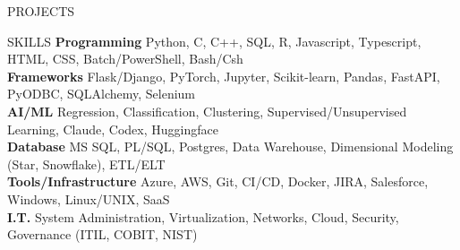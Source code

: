 \documentclass{resume} %
\begin{document}
\begin{rSection}{PROJECTS}
\begin{itemize}
\end{itemize}
\vspace{-6pt}

\end{rSection}

\begin{rSection}{SKILLS}
\vspace{-6pt}
\textbf{Programming} Python, C, C++, SQL, R, Javascript, Typescript, HTML, CSS, Batch/PowerShell, Bash/Csh \\
\textbf{Frameworks} Flask/Django, PyTorch, Jupyter, Scikit-learn, Pandas, FastAPI, PyODBC, SQLAlchemy, Selenium \\
\textbf{AI/ML} Regression, Classification, Clustering, Supervised/Unsupervised Learning, Claude, Codex, Huggingface \\
\textbf{Database} MS SQL, PL/SQL, Postgres, Data Warehouse, Dimensional Modeling (Star, Snowflake), ETL/ELT \\
\textbf{Tools/Infrastructure} Azure, AWS, Git, CI/CD, Docker, JIRA, Salesforce, Windows, Linux/UNIX, SaaS \\
\textbf{I.T.} System Administration, Virtualization, Networks, Cloud, Security, Governance (ITIL, COBIT, NIST)
\vspace{-6pt}

\end{rSection}

\end{document}
